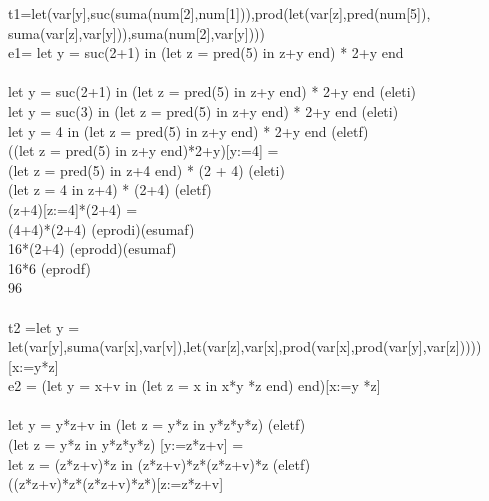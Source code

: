 \documentclass[11pt, a4paper]{report}
\begin{document}
\begin{enumerate}[label=\alph*)]
\begin{itemize}
t1=let(var[y],suc(suma(num[2],num[1])),prod(let(var[z],pred(num[5]),\\suma(var[z],var[y])),suma(num[2],var[y])))\\
e1= let y = suc(2+1) in (let z = pred(5) in z+y end) * 2+y end \\\\
let y = suc(2+1) in (let z = pred(5) in z+y end) * 2+y end			(eleti)\\
let y = suc(3) in (let z = pred(5) in z+y end) * 2+y end			(eleti)\\
let y = 4 in (let z = pred(5) in z+y end) * 2+y	end				(eletf)\\
((let z = pred(5) in z+y end)*2+y)[y:=4]					=\\
(let z = pred(5) in z+4 end) * (2 + 4)						(eleti)\\
(let z = 4 in z+4) * (2+4)							(eletf)\\
(z+4)[z:=4]*(2+4)								=\\
(4+4)*(2+4)									(eprodi)(esumaf)\\
16*(2+4)									(eprodd)(esumaf)\\
16*6										(eprodf)\\
96\\\\
t2 =let y = let(var[y],suma(var[x],var[v]),let(var[z],var[x],prod(var[x],prod(var[y],var[z])))) [x:=y*z]\\
e2 =  (let y = x+v in (let z = x in x*y *z end) end)[x:=y *z]\\\\
let y = y*z+v in (let z = y*z in y*z*y*z) 					(eletf)\\
(let z = y*z in y*z*y*z) [y:=z*z+v]						=\\
let z = (z*z+v)*z in (z*z+v)*z*(z*z+v)*z					(eletf)\\
((z*z+v)*z*(z*z+v)*z*)[z:=z*z+v]\\
\end{itemize}

  \end{enumerate}

  
\end{document}
